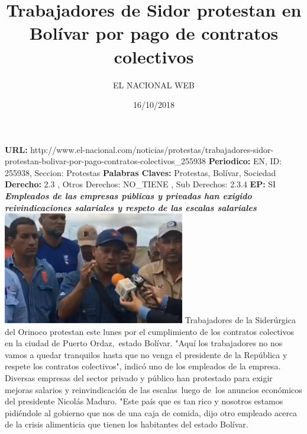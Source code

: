 \documentclass{article}%
\title{\textbf{Trabajadores de Sidor protestan en Bolívar por pago de contratos colectivos}}%
\author{EL NACIONAL WEB}%
\date{16/10/2018}%
\begin{document}
%
\normalsize%
\maketitle%
\textbf{URL: }%
http://www.el{-}nacional.com/noticias/protestas/trabajadores{-}sidor{-}protestan{-}bolivar{-}por{-}pago{-}contratos{-}colectivos\_255938\newline%
%
\textbf{Periodico: }%
EN, %
ID: %
255938, %
Seccion: %
Protestas\newline%
%
\textbf{Palabras Claves: }%
Protestas, Bolívar, Sociedad\newline%
%
\textbf{Derecho: }%
2.3%
, Otros Derechos: %
NO\_TIENE%
, Sub Derechos: %
2.3.4%
\newline%
%
\textbf{EP: }%
SI\newline%
\newline%
%
\textbf{\textit{Empleados de las empresas públicas y privadas han exigido reivindicaciones salariales y respeto de las escalas salariales}}%
\newline%
\newline%
%
\includegraphics[width=300px]{41.jpg}%
\newline%
%
Trabajadores de la Siderúrgica del Orinoco protestan este lunes por el cumplimiento de los contratos colectivos en la ciudad de Puerto Ordaz,~estado Bolívar.%
\newline%
%
"Aquí los trabajadores no nos vamos a quedar tranquilos hasta que no venga el presidente de la República y respete los contratos colectivos", indicó uno de los empleados de la empresa.%
\newline%
%
Diversas empresas del sector privado y público han protestado para exigir mejoras salarios y reinvindicación de las escalas~luego de~los anuncios económicos del presidente Nicolás Maduro.%
\newline%
%
"Este país que es tan rico y nosotros estamos pidiéndole al gobierno que nos de una caja de comida, dijo otro empleado acerca de la crisis alimenticia que tienen los habitantes del estado Bolívar.%
\newline%
%
\end{document}
